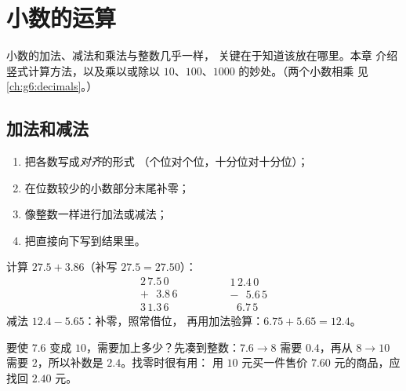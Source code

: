 \chapter{小数的运算}\label{ch:g5:decimalops}

小数的加法、减法和乘法与整数几乎一样，
关键在于知道该放在哪里。本章
介绍竖式计算方法，以及乘以或除以
$10$、$100$、$1000$ 的妙处。（两个小数相乘
见\cref{ch:g6:decimals}。）

\section{加法和减法}

\begin{method}[小数点对齐的竖式]\label{met:g5:decimalops:addsub}
\begin{enumerate}
  \item 把各数写成\emph{对齐}的形式
        （个位对个位，十分位对十分位）；
  \item 在位数较少的小数部分末尾补零；
  \item 像整数一样进行加法或减法；
  \item 把直接向下写到结果里。
\end{enumerate}
\end{method}

\begin{example}\label{ex:g5:decimalops:addsub}
计算 $27.5 + 3.86$（补写 $27.5 = 27.50$）：
\[
\begin{array}{r}
2\,7.5\,0 \\
+\ \ \ 3.8\,6 \\
\hline
3\,1.3\,6
\end{array}
\qquad\qquad
\begin{array}{r}
1\,2.4\,0 \\
-\ \ \ 5.6\,5 \\
\hline
\ \ \,6.7\,5
\end{array}
\]
减法 $12.4 - 5.65$：补零，照常借位，
再用加法验算：$6.75 + 5.65 = 12.4$。
\end{example}

\begin{example}[求补数]\label{ex:g5:decimalops:complement}
要使 $7.6$ 变成 $10$，需要加上多少？先凑到整数：$7.6 \to 8$ 需要
$0.4$，再从 $8 \to 10$ 需要 $2$，所以补数是 $2.4$。找零时很有用：
用 $10$ 元买一件售价 $7.60$ 元的商品，应找回 $2.40$ 元。
\end{example}

